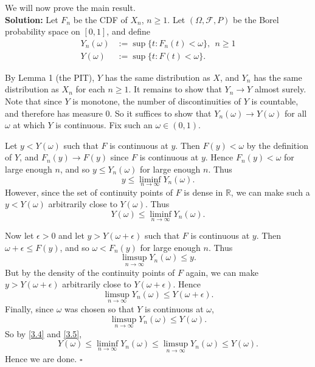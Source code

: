 \documentclass[12pt]{article}
\newcounter{ProofCounter}
\newenvironment{Solution}{\stepcounter{ProofCounter}\textbf{Solution:}}{\hfill$\square$}
\newcommand\toinf{\rightarrow\infty}
\begin{document}
\vspace{5mm}

We will now prove the main result. \\

\begin{Solution}
  Let $F_n$ be the CDF of $X_n$, $n \geq 1$. Let $(\Omega, \mathcal{F}, P)$ be the Borel probability space on $[0, 1]$, and define
  \begin{align*}
    Y_n(\omega) & := \sup\{ t : F_n(t) < \omega \},  \ \ n \geq 1 \\
    Y(\omega) & := \sup\{ t : F(t) < \omega \}.
  \end{align*}

  By Lemma 1 (the PIT), $Y$ has the same distribution as $X$, and $Y_n$ has the same distribution as $X_n$ for each $n \geq 1$. It remains to show that $Y_n \rightarrow Y$ almost surely. Note that since $Y$ is monotone, the number of discontinuities of $Y$ is countable, and therefore has measure 0. So it suffices to show that $Y_n(\omega) \rightarrow Y(\omega)$ for all $\omega$ at which $Y$ is continuous. Fix such an $\omega \in (0,1)$.

  Let $y < Y(\omega)$ such that $F$ is continuous at $y$. Then $F(y) < \omega$ by the definition of $Y$, and $F_n(y) \rightarrow F(y)$ since $F$ is continuous at $y$. Hence $F_n(y) < \omega$ for large enough $n$, and so $y \leq Y_n(\omega)$ for large enough $n$. Thus
  \[
    y \leq \liminf_{n\rightarrow\infty} Y_n(\omega).
  \]
  However, since the set of continuity points of $F$ is dense in $\mathbb{R}$, we can make such a $y < Y(\omega)$ arbitrarily close to $Y(\omega)$. Thus
  \begin{equation}
    Y(\omega) \leq \liminf_{n\rightarrow\infty} Y_n(\omega).
    \label{3.4}
  \end{equation}

  Now let $\epsilon > 0$ and let $y > Y(\omega + \epsilon)$ such that $F$ is continuous at $y$. Then $\omega + \epsilon \leq F(y)$, and so $\omega < F_n(y)$ for large enough $n$. Thus
  \[
    \limsup_{n\rightarrow\infty} Y_n(\omega) \leq y.
  \]
  But by the density of the continuity points of $F$ again, we can make $y > Y(\omega + \epsilon)$ arbitrarily close to $Y(\omega + \epsilon)$. Hence
  \[
    \limsup_{n\rightarrow\infty} Y_n(\omega) \leq Y(\omega + \epsilon).
  \]
  Finally, since $\omega$ was chosen so that $Y$ is continuous at $\omega$,
  \begin{equation}
    \limsup_{n\rightarrow\infty} Y_n(\omega) \leq Y(\omega).
    \label{3.5}
  \end{equation}
  So by \eqref{3.4} and \eqref{3.5},
  \[
    Y(\omega) \leq \liminf_{n\toinf} Y_n(\omega) \leq \limsup_{n\toinf} Y_n(\omega) \leq Y(\omega).
  \]
  Hence we are done.
\end{Solution}
\end{document}
